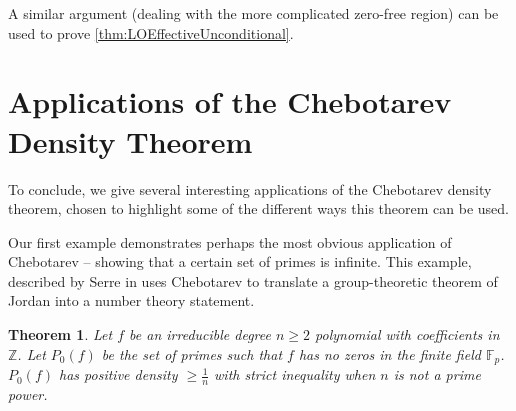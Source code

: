 \documentclass[12pt]{amsart}
\newtheorem{thm}{Theorem}[section]
\theoremstyle{definition}
\theoremstyle{remark}
\numberwithin{equation}{section}
\newcommand{\bbF}{\mathbb F}
\newcommand{\bbZ}{\mathbb Z}
\begin{document}
A similar argument (dealing with the more complicated zero-free region) can be used to prove \ref{thm:LOEffectiveUnconditional}.

\section{Applications of the Chebotarev Density Theorem} \label{sec:Applications}

To conclude, we give several interesting applications of the Chebotarev density theorem, chosen to highlight some of the different ways this theorem can be used.

Our first example demonstrates perhaps the most obvious application of Chebotarev -- showing that a certain set of primes is infinite. This example, described by Serre in \cite{Serre03} uses Chebotarev to translate a group-theoretic theorem of Jordan into a number theory statement.
\begin{thm}
Let $f$ be an irreducible degree $n \geq 2$ polynomial with coefficients in $\bbZ$. Let $P_{0}(f)$ be the set of primes such that $f$ has no zeros in the finite field $\bbF_{p}$. $P_{0}(f)$ has positive density $ \geq \frac{1}{n}$ with strict inequality when $n$ is not a prime power.
\end{thm}
\end{document}
